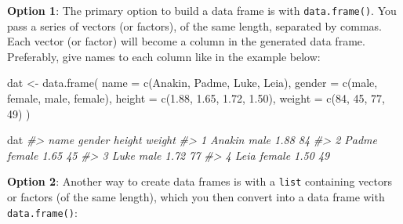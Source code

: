 \documentclass[
]{book}
\newenvironment{Shaded}{\begin{snugshade}}{\end{snugshade}}
\newcommand{\AttributeTok}[1]{\textcolor[rgb]{0.77,0.63,0.00}{#1}}
\newcommand{\CommentTok}[1]{\textcolor[rgb]{0.56,0.35,0.01}{\textit{#1}}}
\newcommand{\DecValTok}[1]{\textcolor[rgb]{0.00,0.00,0.81}{#1}}
\newcommand{\FloatTok}[1]{\textcolor[rgb]{0.00,0.00,0.81}{#1}}
\newcommand{\FunctionTok}[1]{\textcolor[rgb]{0.00,0.00,0.00}{#1}}
\newcommand{\NormalTok}[1]{#1}
\newcommand{\OtherTok}[1]{\textcolor[rgb]{0.56,0.35,0.01}{#1}}
\newcommand{\StringTok}[1]{\textcolor[rgb]{0.31,0.60,0.02}{#1}}
\begin{document}
\textbf{Option 1}: The primary option to build a data frame is with \texttt{data.frame()}.
You pass a series of vectors (or factors), of the same length, separated by commas.
Each vector (or factor) will become a column in the generated data frame.
Preferably, give names to each column like in the example below:

\begin{Shaded}
\begin{Highlighting}[]
\NormalTok{dat }\OtherTok{\textless{}{-}} \FunctionTok{data.frame}\NormalTok{(}
  \AttributeTok{name =} \FunctionTok{c}\NormalTok{(}\StringTok{\textquotesingle{}Anakin\textquotesingle{}}\NormalTok{, }\StringTok{\textquotesingle{}Padme\textquotesingle{}}\NormalTok{, }\StringTok{\textquotesingle{}Luke\textquotesingle{}}\NormalTok{, }\StringTok{\textquotesingle{}Leia\textquotesingle{}}\NormalTok{),}
  \AttributeTok{gender =} \FunctionTok{c}\NormalTok{(}\StringTok{\textquotesingle{}male\textquotesingle{}}\NormalTok{, }\StringTok{\textquotesingle{}female\textquotesingle{}}\NormalTok{, }\StringTok{\textquotesingle{}male\textquotesingle{}}\NormalTok{, }\StringTok{\textquotesingle{}female\textquotesingle{}}\NormalTok{),}
  \AttributeTok{height =} \FunctionTok{c}\NormalTok{(}\FloatTok{1.88}\NormalTok{, }\FloatTok{1.65}\NormalTok{, }\FloatTok{1.72}\NormalTok{, }\FloatTok{1.50}\NormalTok{),}
  \AttributeTok{weight =} \FunctionTok{c}\NormalTok{(}\DecValTok{84}\NormalTok{, }\DecValTok{45}\NormalTok{, }\DecValTok{77}\NormalTok{, }\DecValTok{49}\NormalTok{)}
\NormalTok{) }

\NormalTok{dat}
\CommentTok{\#\textgreater{}     name gender height weight}
\CommentTok{\#\textgreater{} 1 Anakin   male   1.88     84}
\CommentTok{\#\textgreater{} 2  Padme female   1.65     45}
\CommentTok{\#\textgreater{} 3   Luke   male   1.72     77}
\CommentTok{\#\textgreater{} 4   Leia female   1.50     49}
\end{Highlighting}
\end{Shaded}

\textbf{Option 2}: Another way to create data frames is with a \texttt{list} containing
vectors or factors (of the same length), which you then convert into a data
frame with \texttt{data.frame()}:
\end{document}
